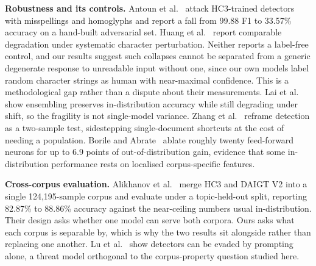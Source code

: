 \textbf{Robustness and its controls.} Antoun et al.~\cite{Antoun2023towards} attack HC3-trained detectors with misspellings and homoglyphs and report a fall from 99.88 F1 to 33.57\% accuracy on a hand-built adversarial set. Huang et al.~\cite{Huang2024generated} report comparable degradation under systematic character perturbation. Neither reports a label-free control, and our results suggest such collapses cannot be separated from a generic degenerate response to unreadable input without one, since our own models label random character strings as human with near-maximal confidence. This is a methodological gap rather than a dispute about their measurements. Lai et al.~\cite{Lai2024adaptive} show ensembling preserves in-distribution accuracy while still degrading under shift, so the fragility is not single-model variance. Zhang et al.~\cite{Zhang2024detecting} reframe detection as a two-sample test, sidestepping single-document shortcuts at the cost of needing a population. Borile and Abrate~\cite{Borile2025generalize} ablate roughly twenty feed-forward neurons for up to 6.9 points of out-of-distribution gain, evidence that some in-distribution performance rests on localised corpus-specific features.

\textbf{Cross-corpus evaluation.} Alikhanov et al.~\cite{Alikhanov2026generated} merge HC3 and DAIGT V2 into a single 124,195-sample corpus and evaluate under a topic-held-out split, reporting 82.87\% to 88.86\% accuracy against the near-ceiling numbers usual in-distribution. Their design asks whether one model can serve both corpora. Ours asks what each corpus is separable by, which is why the two results sit alongside rather than replacing one another. Lu et al.~\cite{Lu2023large} show detectors can be evaded by prompting alone, a threat model orthogonal to the corpus-property question studied here.
